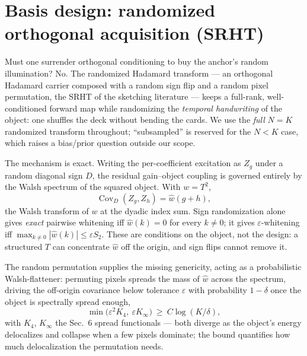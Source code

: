 \section{Basis design: randomized orthogonal acquisition (SRHT)}

Must one surrender orthogonal conditioning to buy the anchor's random illumination? No. The randomized Hadamard transform --- an orthogonal Hadamard carrier composed with a random sign flip and a random pixel permutation, the SRHT of the sketching literature --- keeps a full-rank, well-conditioned forward map while randomizing the \emph{temporal handwriting} of the object: one shuffles the deck without bending the cards. We use the \emph{full} $N=K$ randomized transform throughout; ``subsampled'' is reserved for the $N<K$ case, which raises a bias/prior question outside our scope.

The mechanism is exact. Writing the per-coefficient excitation as $Z_g$ under a random diagonal sign $D$, the residual gain--object coupling is governed entirely by the Walsh spectrum of the squared object. With $w = T^2$,
\[\operatorname{Cov}_D(Z_g, Z_h) = \hat{w}(g+h),\]
the Walsh transform of $w$ at the dyadic index sum. Sign randomization alone gives \emph{exact} pairwise whitening iff $\hat w(k)=0$ for every $k\ne0$; it gives $\varepsilon$-whitening iff $\max_{k\ne0}|\hat w(k)|\le\varepsilon S_2$. These are conditions on the object, not the design: a structured $T$ can concentrate $\hat w$ off the origin, and sign flips cannot remove it.

The random permutation supplies the missing genericity, acting as a probabilistic Walsh-flattener: permuting pixels spreads the mass of $\hat{w}$ across the spectrum, driving the off-origin covariance below tolerance $\varepsilon$ with probability $1-\delta$ once the object is spectrally spread enough,
\[\min\!\big(\varepsilon^2 K_4,\ \varepsilon K_\infty\big) \ \geq\ C \log(K/\delta),\]
with $K_4$, $K_\infty$ the Sec.~6 spread functionals --- both diverge as the object's energy delocalizes and collapse when a few pixels dominate; the bound quantifies how much delocalization the permutation needs.

